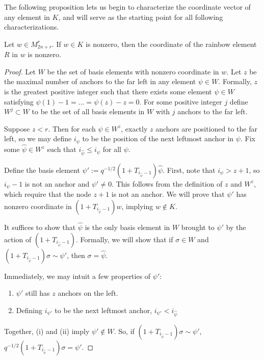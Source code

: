 \documentclass{amsart}
\begin{document}
The following proposition lets us begin to characterize the coordinate vector of any element in $K$, and will serve as the starting point for all following characterizations.


\begin{proposition}
	Let $w\in M_{2n+r}^r$. If $w\in K$ is nonzero, then the coordinate of the rainbow element $R$ in $w$ is nonzero.
	
	\label{rainbow nonzero}
\end{proposition}	

\begin{proof}
	Let $W$ be the set of basis elements with nonzero coordinate in $w$. Let $z$ be the maximal number of anchors to the far left in any element $\psi\in W$. Formally, $z$ is the greatest positive integer such that there exists some element $\psi\in W$ satisfying $\psi(1)-1=...=\psi(z)-z=0$. For some positive integer $j$ define $W^j\subset W$ to be the set of all basis elements in $W$ with $j$ anchors to the far left.
	
	Suppose $z<r$. Then for each $\psi\in W^z$, exactly $z$ anchors are positioned to the far left, so we may define $i_\psi$ to be the position of the next leftmost anchor in $\psi$. Fix some $\widehat{\psi}\in W^z$ such that $i_{\widehat{\psi}}\leq i_\psi$ for all $\psi$.
	
	Define the basis element $\psi':=q^{-1/2}(1+T_{i_{\widehat{\psi}}-1})\widehat{\psi}$. First, note that $i_\psi>z+1$, so $i_\psi-1$ is not an anchor and $\psi'\not=0$. This follows from the definition of $z$ and $W^z$, which require that the node $z+1$ is not an anchor. We will prove that $\psi'$ has nonzero coordinate in $(1+T_{i_{\widehat{\psi}}-1})w$, implying $w\not\in K$. 
	
	It suffices to show that $\widehat{\psi}$ is the only basis element in $W$ brought to $\psi'$ by the action of $(1+T_{i_{\widehat{\psi}}-1})$. Formally, we will show that if $\sigma\in W$ and $(1+T_{i_{\widehat{\psi}}-1})\sigma\sim \psi'$, then $\sigma=\widehat{\psi}$. 
	
	Immediately, we may intuit a few properties of $\psi'$:
	\begin{enumerate}[label={(\roman*)}]
		\item $\psi'$ still has $z$ anchors on the left.
		\item Defining $i_{\psi'}$ to be the next leftmost anchor, $i_{\psi'}<i_{\widehat{\psi}}$
	\end{enumerate}
	
	Together, (i) and (ii) imply $\psi'\not\in W$. So, if $(1+T_{i_{\widehat{\psi}}-1})\sigma\sim \psi'$, $q^{-1/2}(1+T_{i_{\widehat{\psi}}-1})\sigma=\psi'$.
	

\end{proof}
\end{document}
